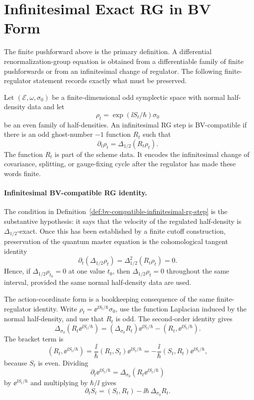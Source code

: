 \section{Infinitesimal Exact RG in BV Form}
\label{sec:bv-infinitesimal-exact-rg}

The finite pushforward above is the primary definition.  A differential
renormalization-group equation is obtained from a differentiable family of
finite pushforwards or from an infinitesimal change of regulator.  The
following finite-regulator statement records exactly what must be preserved.

\begin{definition}
\label{def:bv-compatible-infinitesimal-rg-step}
Let \((\mathcal E,\omega,\sigma_0)\) be a finite-dimensional odd symplectic
space with normal half-density data and let
\[
  \rho_t=\exp(\ii S_t/\hbar)\sigma_0
\]
be an even family of half-densities.  An infinitesimal RG step is
BV-compatible if there is an odd ghost-number \(-1\) function \(R_t\) such
that
\begin{equation}
  \partial_t\rho_t
  =
  \Delta_{1/2}(R_t\rho_t).
  \label{eq:bv-infinitesimal-rg-density}
\end{equation}
The function \(R_t\) is part of the scheme data.  It encodes the infinitesimal
change of covariance, splitting, or gauge-fixing cycle after the regulator has
made these words finite.
\end{definition}

\paragraph{Infinitesimal BV-compatible RG identity.}
The condition in Definition~\ref{def:bv-compatible-infinitesimal-rg-step} is
the substantive hypothesis: it says that the velocity of the regulated
half-density is \(\Delta_{1/2}\)-exact.  Once this has been established by a
finite cutoff construction, preservation of the quantum master equation is the
cohomological tangent identity
\[
  \partial_t(\Delta_{1/2}\rho_t)
  =
  \Delta_{1/2}^2(R_t\rho_t)=0 .
\]
Hence, if \(\Delta_{1/2}\rho_{t_0}=0\) at one value \(t_0\), then
\(\Delta_{1/2}\rho_t=0\) throughout the same interval, provided the same
normal half-density data are used.

The action-coordinate form is a bookkeeping consequence of the same
finite-regulator identity.  Write
\(\rho_t=\ee^{\ii S_t/\hbar}\sigma_0\), use the function Laplacian induced by
the normal half-density, and use that \(R_t\) is odd.  The second-order
identity gives
\[
  \Delta_{\sigma_0}(R_t\ee^{\ii S_t/\hbar})
  =
  (\Delta_{\sigma_0}R_t)\ee^{\ii S_t/\hbar}
  -
  (R_t,\ee^{\ii S_t/\hbar}).
  \]
The bracket term is
\[
  (R_t,\ee^{\ii S_t/\hbar})
  =
  \frac{\ii}{\hbar}(R_t,S_t)\ee^{\ii S_t/\hbar}
  =
  -\frac{\ii}{\hbar}(S_t,R_t)\ee^{\ii S_t/\hbar},
\]
because \(S_t\) is even.  Dividing
\[
  \partial_t\ee^{\ii S_t/\hbar}
  =
  \Delta_{\sigma_0}(R_t\ee^{\ii S_t/\hbar})
\]
by \(\ee^{\ii S_t/\hbar}\) and multiplying by \(\hbar/\ii\) gives
\begin{equation}
  \partial_t S_t
  =
  (S_t,R_t)-\ii\hbar\,\Delta_{\sigma_0}R_t .
  \label{eq:bv-infinitesimal-rg-action}
\end{equation}

